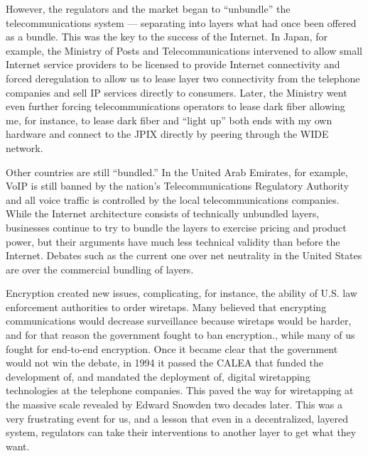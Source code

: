 However, the regulators and the market began to ``unbundle'' the telecommunications system --- separating into layers what had once been offered as a bundle. This was the key to the success of the Internet. In Japan, for example, the Ministry of Posts and Telecommunications intervened to allow small Internet service providers to be licensed to provide Internet connectivity and forced deregulation to allow us to lease layer two connectivity from the telephone companies and sell IP services directly to consumers. Later, the Ministry went even further forcing telecommunications operators to lease dark fiber allowing me, for instance, to lease dark fiber and ``light up'' both ends with my own hardware and connect to the \ac{JPIX} directly by peering through the \ac{WIDE} network.

Other countries are still ``bundled.'' In the United Arab Emirates, for example, \ac{VoIP} is still banned by the nation's Telecommunications Regulatory Authority and all voice traffic is controlled by the local telecommunications companies. While the Internet architecture consists of technically unbundled layers, businesses continue to try to bundle the layers to exercise pricing and product power, but their arguments have much less technical validity than before the Internet.  Debates such as the current one over net neutrality in the United States are over the commercial bundling of layers.

Encryption created new issues, complicating, for instance, the ability of U.S. law enforcement authorities to order wiretaps. Many believed that encrypting communications would decrease surveillance because wiretaps would be harder, and for that reason the government fought to ban encryption., while many of us fought for end-to-end encryption. Once it became clear that the government would not win the debate, in 1994 it passed the \ac{CALEA} that funded the development of, and mandated the deployment of, digital wiretapping technologies at the telephone companies. This paved the way for wiretapping at the massive scale revealed by Edward Snowden two decades later. This was a very frustrating event for us, and a lesson that even in a decentralized, layered system, regulators can take their interventions to another layer to get what they want.

